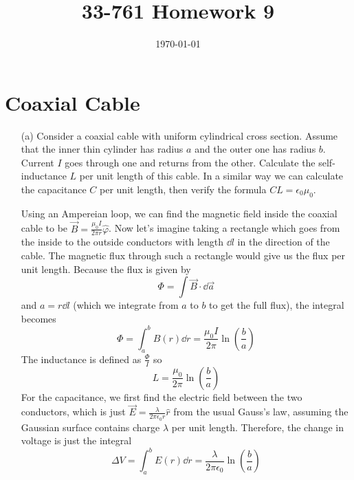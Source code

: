 \documentclass[a4paper,twoside]{article}
\title{33-761 Homework 9}
\date{\today}
\begin{document}
\maketitle

\section{Coaxial Cable}
\begin{itemize}
    \item[(a)] Consider a coaxial cable with uniform cylindrical cross section. Assume that the inner thin cylinder has radius $ a $ and the outer one has radius $ b $. Current $ I $ goes through one and returns from the other. Calculate the self-inductance $ L $ per unit length of this cable. In a similar way we can calculate the capacitance $ C $ per unit length, then verify the formula $ CL = \epsilon_0 \mu_0 $.
        \begin{problem}
            Using an Ampereian loop, we can find the magnetic field inside the coaxial cable to be $ \vec{B} = \frac{\mu_0 I}{2 \pi r} \hat{\varphi} $. Now let's imagine taking a rectangle which goes from the inside to the outside conductors with length $ \dd{l} $ in the direction of the cable. The magnetic flux through such a rectangle would give us the flux per unit length. Because the flux is given by
            \begin{equation}
                \Phi = \int \vec{B} \cdot \dd{\vec{a}}
            \end{equation}
            and $ a = r \dd{l} $ (which we integrate from $ a $ to $ b $ to get the full flux), the integral becomes
            \begin{equation}
                \Phi = \int_{a}^{b} B(r) \dd{r} = \frac{\mu_0 I}{2 \pi} \ln(\frac{b}{a})
            \end{equation}
            The inductance is defined as $ \frac{\Phi}{I} $ so
            \begin{equation}
                L = \frac{\mu_0}{2 \pi} \ln(\frac{b}{a})
            \end{equation}
            For the capacitance, we first find the electric field between the two conductors, which is just $ \vec{E} = \frac{\lambda}{2 \pi \epsilon_0 r} \hat{r} $ from the usual Gauss's law, assuming the Gaussian surface contains charge $ \lambda $ per unit length. Therefore, the change in voltage is just the integral
            \begin{equation}
                \Delta V = \int_{a}^{b} E(r) \dd{r} = \frac{\lambda}{2 \pi \epsilon_0} \ln(\frac{b}{a})

\end{equation}
\end{problem}
\end{itemize}
\end{document}
